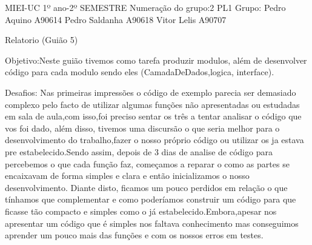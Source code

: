 M\+I\+E\+I-\/\+UC 1º ano-\/2º S\+E\+M\+E\+S\+T\+RE Numeração do grupo\+:2 P\+L1 Grupo\+: Pedro Aquino A90614 Pedro Saldanha A90618 Vitor Lelis A90707

Relatorio (Guião 5)

Objetivo\+:Neste guião tivemos como tarefa produzir modulos, além de desenvolver código para cada modulo sendo eles (Camada\+De\+Dados,logica, interface).

Desafios\+: Nas primeiras impressões o código de exemplo parecia ser demasiado complexo pelo facto de utilizar algumas funções não apresentadas ou estudadas em sala de aula,com isso,foi preciso sentar os três a tentar analisar o código que vos foi dado, além disso, tivemos uma discursão o que seria melhor para o desenvolvimento do trabalho,fazer o nosso próprio código ou utilizar os ja estava pre estabelecido.\+Sendo assim, depois de 3 dias de analise de código para percebemos o que cada função faz, começamos a reparar o como as partes se encaixavam de forma simples e clara e então inicializamos o nosso desenvolvimento. Diante disto, ficamos um pouco perdidos em relação o que tínhamos que complementar e como poderíamos construir um código para que ficasse tão compacto e simples como o já estabelecido.\+Embora,apesar nos apresentar um código que é simples nos faltava conhecimento mas conseguimos aprender um pouco mais das funções e com os nossos erros em testes. 